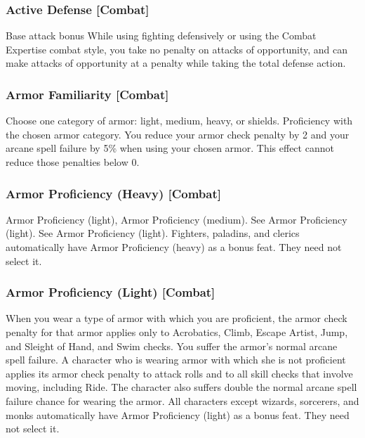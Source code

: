 \subsubsection{Active Defense [Combat]}
 Base attack bonus 
 While using fighting defensively or using the Combat Expertise combat style, you take no penalty on attacks of opportunity, and can make attacks of opportunity at a  penalty while taking the total defense action.

\subsubsection{Armor Familiarity [Combat]}
Choose one category of armor: light, medium, heavy, or shields.
 Proficiency with the chosen armor category.
 You reduce your armor check penalty by 2 and your arcane spell failure by 5\% when using your chosen armor. This effect cannot reduce those penalties below 0.

\subsubsection{Armor Proficiency (Heavy) [Combat]}
 Armor Proficiency (light), Armor Proficiency (medium).
 See Armor Proficiency (light).
 See Armor Proficiency (light).
 Fighters, paladins, and clerics automatically have Armor Proficiency (heavy) as a bonus feat. They need not select it.

\subsubsection{Armor Proficiency (Light) [Combat]}
 When you wear a type of armor with which you are proficient, the armor check penalty for that armor applies only to Acrobatics, Climb, Escape Artist, Jump, and Sleight of Hand, and Swim checks. You suffer the armor's normal arcane spell failure.
 A character who is wearing armor with which she is not proficient applies its armor check penalty to attack rolls and to all skill checks that involve moving, including Ride. The character also suffers double the normal arcane spell failure chance for wearing the armor.
 All characters except wizards, sorcerers, and monks automatically have Armor Proficiency (light) as a bonus feat. They need not select it.

